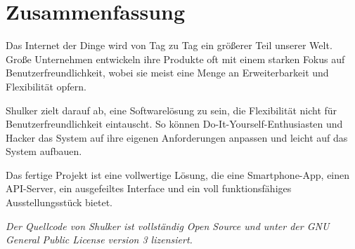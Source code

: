 \section*{Zusammenfassung}

Das Internet der Dinge wird von Tag zu Tag ein größerer Teil unserer Welt. Große Unternehmen entwickeln ihre Produkte oft mit einem starken Fokus auf Benutzerfreundlichkeit, wobei sie meist eine Menge an Erweiterbarkeit und Flexibilität opfern.

Shulker zielt darauf ab, eine Softwarelösung zu sein, die Flexibilität nicht für Benutzerfreundlichkeit eintauscht. So können Do-It-Yourself-Enthusiasten und Hacker das System auf ihre eigenen Anforderungen anpassen und leicht auf das System aufbauen.

Das fertige Projekt ist eine vollwertige Lösung, die eine Smartphone-App, einen API-Server, ein ausgefeiltes Interface und ein voll funktionsfähiges Ausstellungsstück bietet.

\textit{Der Quellcode von Shulker ist vollständig Open Source und unter der GNU General Public License version 3 lizensiert.}

\newpage